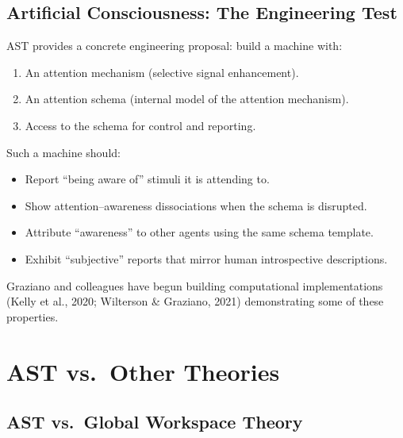 \documentclass[11pt,a4paper]{report}
\begin{document}
\section{Artificial Consciousness: The Engineering Test}

AST provides a concrete engineering proposal: build a machine with:
\begin{enumerate}[leftmargin=2em]
  \item An attention mechanism (selective signal enhancement).
  \item An attention schema (internal model of the attention mechanism).
  \item Access to the schema for control and reporting.
\end{enumerate}

Such a machine should:
\begin{itemize}[leftmargin=1.5em]
  \item Report ``being aware of'' stimuli it is attending to.
  \item Show attention--awareness dissociations when the schema is disrupted.
  \item Attribute ``awareness'' to other agents using the same schema template.
  \item Exhibit ``subjective'' reports that mirror human introspective descriptions.
\end{itemize}

Graziano and colleagues have begun building computational implementations (Kelly et al., 2020; Wilterson \& Graziano, 2021) demonstrating some of these properties.


\chapter{AST vs.\ Other Theories}

\section{AST vs.\ Global Workspace Theory}
\end{document}
